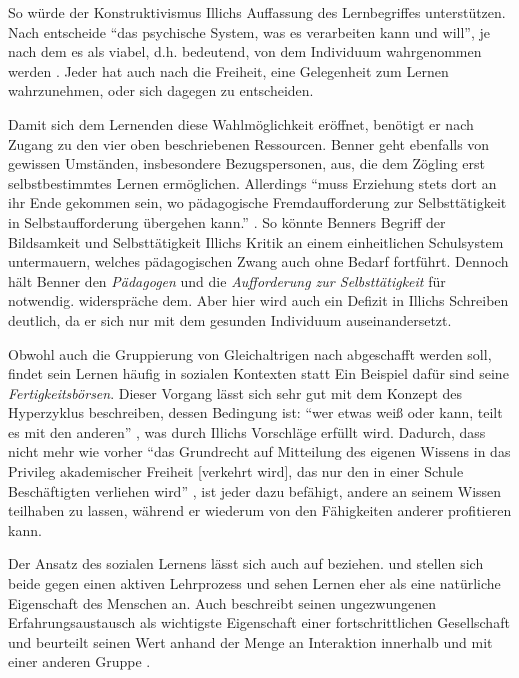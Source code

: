 So würde der Konstruktivismus Illichs Auffassung des Lernbegriffes unterstützen.
Nach \citeauthor{siebert-2003} entscheide ``das psychische System, was es verarbeiten kann und will'', je nach dem es als viabel, d.h. bedeutend, von dem Individuum wahrgenommen werden \parencite[13]{siebert-2003}.
Jeder hat auch nach \citeauthor{Illich-1971} die Freiheit, eine Gelegenheit zum Lernen wahrzunehmen, oder sich dagegen zu entscheiden.

Damit sich dem Lernenden diese Wahlmöglichkeit eröffnet, benötigt er nach \citeauthor{Illich-1971} Zugang zu den vier oben beschriebenen Ressourcen.
Benner geht ebenfalls von gewissen Umständen, insbesondere Bezugspersonen, aus, die dem Zögling erst selbstbestimmtes Lernen ermöglichen.
Allerdings ``muss Erziehung stets dort an ihr Ende gekommen sein, wo pädagogische Fremdaufforderung zur Selbsttätigkeit in Selbstaufforderung übergehen kann.'' \parencite[91]{benner-2012}.
So könnte Benners Begriff der Bildsamkeit und Selbsttätigkeit Illichs Kritik an einem einheitlichen Schulsystem untermauern, welches pädagogischen Zwang auch ohne Bedarf fortführt.
Dennoch hält Benner den \emph{Pädagogen} und die \emph{Aufforderung zur Selbsttätigkeit} für notwendig.
\citeauthor{Illich-1971} widerspräche dem.
Aber hier wird auch ein Defizit in Illichs Schreiben deutlich, da er sich nur mit dem gesunden Individuum auseinandersetzt.

Obwohl auch die Gruppierung von Gleichaltrigen nach \citeauthor{Illich-1971} abgeschafft werden soll, findet sein Lernen häufig in sozialen Kontexten statt
Ein Beispiel dafür sind seine \emph{Fertigkeitsbörsen}.
Dieser Vorgang lässt sich sehr gut mit dem Konzept des Hyperzyklus beschreiben, dessen Bedingung ist: ``wer etwas weiß oder kann, teilt es mit den anderen'' \parencite[123]{Zimpel2012}, was durch Illichs Vorschläge erfüllt wird.
Dadurch, dass nicht mehr wie vorher ``das Grundrecht auf Mitteilung des eigenen Wissens in das Privileg akademischer Freiheit [verkehrt wird], das nur den in einer Schule Beschäftigten verliehen wird'' \parencite[97]{Illich-1971}, ist jeder dazu befähigt, andere an seinem Wissen teilhaben zu lassen, während er wiederum von den Fähigkeiten anderer profitieren kann.

Der Ansatz des sozialen Lernens lässt sich auch auf \citeauthor{Dewey2010} beziehen.
\citeauthor{Illich-1971} und \citeauthor{Dewey2010} stellen sich beide gegen einen aktiven Lehrprozess und sehen Lernen eher als eine natürliche Eigenschaft des Menschen an.
Auch \citeauthor{Dewey2010} beschreibt seinen ungezwungenen Erfahrungsaustausch als wichtigste Eigenschaft einer fortschrittlichen Gesellschaft und beurteilt seinen Wert anhand der Menge an Interaktion innerhalb und mit einer anderen Gruppe \parencite[vgl.][89]{Dewey2010}.

